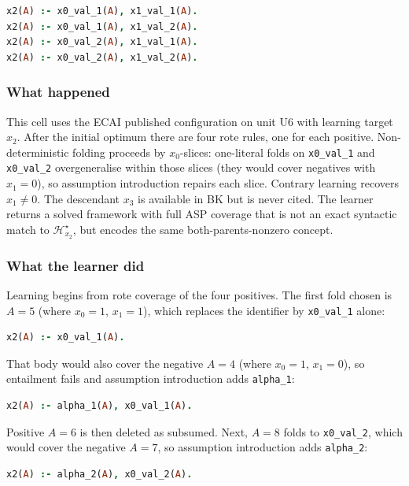 \documentclass[11pt]{article}
\begin{document}
\begin{lstlisting}[style=logic,language=Prolog]
x2(A) :- x0_val_1(A), x1_val_1(A).
x2(A) :- x0_val_1(A), x1_val_2(A).
x2(A) :- x0_val_2(A), x1_val_1(A).
x2(A) :- x0_val_2(A), x1_val_2(A).
\end{lstlisting}

\subsubsection{What happened}

This cell uses the ECAI published configuration on unit U6 with learning target \(x_2\). After the initial optimum there are four rote rules, one for each positive. Non-deterministic folding proceeds by \(x_0\)-slices: one-literal folds on \texttt{x0\_val\_1} and \texttt{x0\_val\_2} overgeneralise within those slices (they would cover negatives with \(x_1=0\)), so assumption introduction repairs each slice. Contrary learning recovers \(x_1\neq 0\). The descendant \(x_3\) is available in BK but is never cited. The learner returns a solved framework with full ASP coverage that is not an exact syntactic match to \(\mathcal{H}_{x_2}^\star\), but encodes the same both-parents-nonzero concept.

\subsubsection{What the learner did}

Learning begins from rote coverage of the four positives. The first fold chosen is \(A=5\) (where \(x_0=1\), \(x_1=1\)), which replaces the identifier by \texttt{x0\_val\_1} alone:

\begin{lstlisting}[style=logic,language=Prolog]
x2(A) :- x0_val_1(A).
\end{lstlisting}

That body would also cover the negative \(A=4\) (where \(x_0=1\), \(x_1=0\)), so entailment fails and assumption introduction adds \texttt{alpha\_1}:

\begin{lstlisting}[style=logic,language=Prolog]
x2(A) :- alpha_1(A), x0_val_1(A).
\end{lstlisting}

Positive \(A=6\) is then deleted as subsumed. Next, \(A=8\) folds to \texttt{x0\_val\_2}, which would cover the negative \(A=7\), so assumption introduction adds \texttt{alpha\_2}:

\begin{lstlisting}[style=logic,language=Prolog]
x2(A) :- alpha_2(A), x0_val_2(A).
\end{lstlisting}
\end{document}
